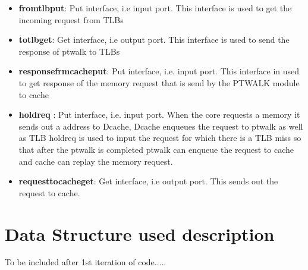 \documentclass{article}
\begin{document}
\begin{itemize}

\item \textbf{from\textunderscore tlb\textunderscore put}: Put interface, i.e input port. This interface is used to get the incoming request from TLBs
\item \textbf{to\textunderscore tlb\textunderscore get}: Get interface, i.e output port. This interface is used to send the response of ptwalk to TLBs
\item \textbf{response\textunderscore frm\textunderscore cache\textunderscore put}: Put interface, i.e. input port. This interface in used to get response of the memory request that is send by the PTWALK module to cache
\item \textbf{hold\textunderscore req} : Put interface, i.e. input port. When the core requests a memory it sends out a address to Dcache, Dcache enqueues the request to ptwalk as well as TLB hold\textunderscore req is used to input the request for which there is a TLB miss so that after the ptwalk is completed ptwalk can enqueue the request to cache and cache can replay the memory request.
\item \textbf{request\textunderscore to\textunderscore cache\textunderscore get}: Get interface, i.e output port. This sends out the request to cache.
\end{itemize}

\newpage

\section{Data Structure used description}

To be included after 1st iteration of code.....





\end{document}

